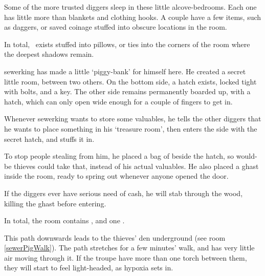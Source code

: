\begin{multicols}{2}
Some of the more trusted \glspl{digger} sleep in these little alcove-bedrooms.
Each one has little more than blankets and clothing hooks.
A couple have a few items, such as daggers, or saved coinage stuffed into obscure locations in the room.

In total, \lootMedium\ exists stuffed into pillows, or ties into the corners of the room where the deepest shadows remain.


\Gls{sewerking} has made a little `piggy-bank' for himself here.
He created a secret little room, between two others.
On the bottom side, a hatch exists, locked tight with bolts, and a key.
The other side remains permanently boarded up, with a hatch, which can only open wide enough for a couple of fingers to get in.

Whenever \gls{sewerking} wants to store some valuables, he tells the other \glspl{digger} that he wants to place something in his `treasure room', then enters the side with the secret hatch, and stuffs it in.

To stop people stealing from him, he placed a bag of  beside the hatch, so would-be thieves could take that, instead of his actual valuables.
He also placed a ghast inside the room, ready to spring out whenever anyone opened the door.

If the \glspl{digger} ever have serious need of cash, he will stab through the wood, killing the ghast before entering.


In total, the room contains \lootBig, and one \lootMagic.

\showTalisman

This path downwards leads to the thieves' den underground (see room \vref{sewerPigWalk}).
The path stretches for a few minutes' walk, and has very little air moving through it.
If the troupe have more than one torch between them, they will start to feel light-headed, as hypoxia sets in.%

\end{multicols}
